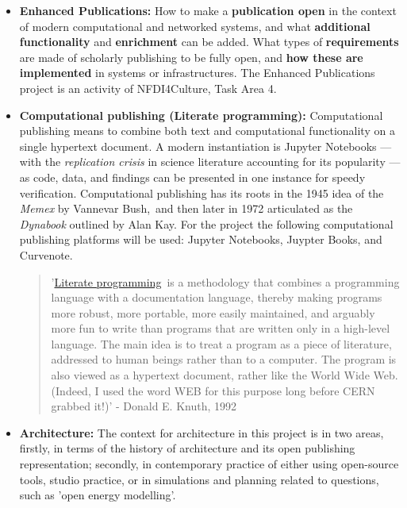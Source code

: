 \documentclass{article}
\begin{document}
\begin{itemize}
\item \textbf{Enhanced Publications:} How to make a \textbf{publication open} in the context of modern computational and networked systems, and what \textbf{additional functionality} and \textbf{enrichment} can be added. What types of \textbf{requirements }are made of scholarly publishing to be fully open, and \textbf{how these are implemented }in systems or infrastructures. The Enhanced Publications project is an activity of NFDI4Culture, Task Area 4. \autocite{WorthingtonSimon20220303}\protect\footnotemark{}


\item \textbf{Computational publishing (Literate programming): }\autocite{KnuthDonald1992} Computational publishing means to combine both text and computational functionality on a single hypertext document. A modern instantiation is Jupyter Notebooks — with the \emph{replication crisis} in science literature accounting for its popularity — as code, data, and findings can be presented in one instance for speedy verification. Computational publishing has its roots in the 1945 idea of the \emph{Memex} by Vannevar Bush, and then later in 1972 articulated as the \emph{Dynabook} outlined by Alan Kay. \autocite{OdewahnAndrew20210619T14:43:08Z} For the project the following computational publishing platforms will be used: Jupyter Notebooks, Juypter Books, and Curvenote.

\begin{quote}



'\href{http://www.literateprogramming.com/}{Literate programming} is a methodology that combines a programming language with a documentation language, thereby making programs more robust, more portable, more easily maintained, and arguably more fun to write than programs that are written only in a high-level language. The main idea is to treat a program as a piece of literature, addressed to human beings rather than to a computer. The program is also viewed as a hypertext document, rather like the World Wide Web. (Indeed, I used the word WEB for this purpose long before CERN grabbed it!)' - Donald E. Knuth, 1992\protect\footnotemark{} 


\end{quote}


\item \textbf{Architecture:} The context for architecture in this project is in two areas, firstly, in terms of the history of architecture and its open publishing representation; secondly, in contemporary practice of either using open-source tools, studio practice, or in simulations and planning related to questions, such as 'open energy modelling'.



\end{itemize}
\end{document}
